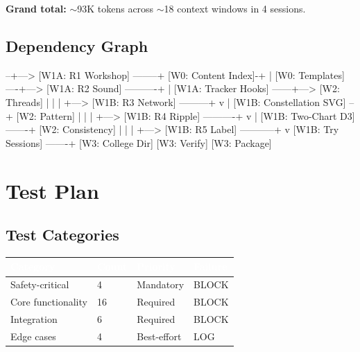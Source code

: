 \documentclass[11pt,letterpaper]{article}
\newcommand{\tableheader}[1]{\textbf{\sffamily\textcolor{white}{#1}}}
\begin{document}
\textbf{Grand total:} $\sim$93K tokens across $\sim$18 context windows in 4 sessions.

\subsection{Dependency Graph}

\begin{asciibox}
  [W0: Interfaces] --+---> [W1A: R1 Workshop] --------+
  [W0: Content Index]-+                                |
  [W0: Templates] ----+---> [W1A: R2 Sound] ----------+
                      |     [W1A: Tracker Hooks] ------+---> [W2: Threads]
                      |                                |          |
                      +---> [W1B: R3 Network] ---------+          v
                      |     [W1B: Constellation SVG] --+    [W2: Pattern]
                      |                                |          |
                      +---> [W1B: R4 Ripple] ----------+          v
                      |     [W1B: Two-Chart D3] -------+    [W2: Consistency]
                      |                                |          |
                      +---> [W1B: R5 Label] -----------+          v
                            [W1B: Try Sessions] -------+    [W3: College Dir]
                                                             [W3: Verify]
                                                             [W3: Package]
\end{asciibox}

\section{Test Plan}

\subsection{Test Categories}

\begin{center}
\begin{tabularx}{\textwidth}{L{3cm}C{1.5cm}C{2cm}C{2cm}}
\toprule
{}
\tableheader{Category} & \tableheader{Count} & \tableheader{Priority} & \tableheader{Failure} \\
\midrule
Safety-critical & 4 & Mandatory & BLOCK \\
Core functionality & 16 & Required & BLOCK \\
Integration & 6 & Required & BLOCK \\
Edge cases & 4 & Best-effort & LOG \\
\bottomrule
\end{tabularx}
\end{center}
\end{document}
